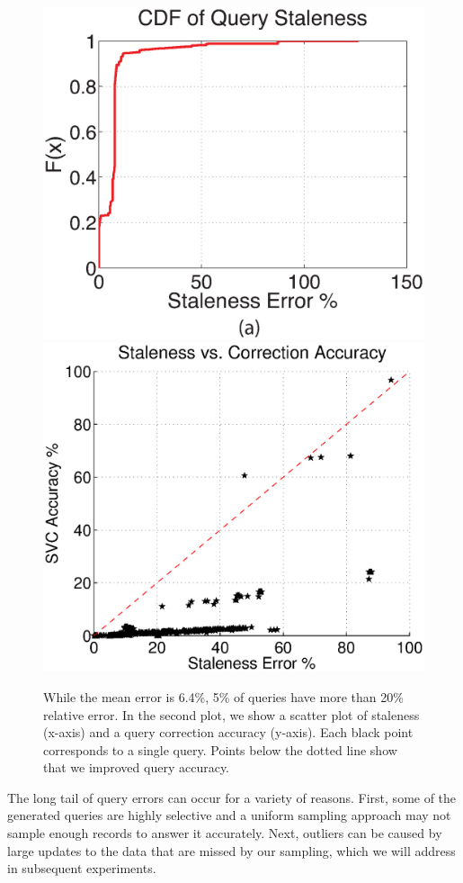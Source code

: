 \begin{figure}[ht!]
\centering
 \includegraphics[scale=0.22]{exp/query_error_dist.eps}
 \includegraphics[scale=0.21]{exp/query_error_dist2.eps}\vspace{-.5em}
 \caption{While the mean error is 6.4\%, 5\% of queries have more than 20\% relative error. In the second plot, we show a scatter plot of staleness (x-axis) and a query correction accuracy (y-axis). Each black point corresponds to a single query. Points below the dotted line show that we improved query accuracy.}\label{exp3dist} %
\end{figure}
The long tail of query errors can occur for a variety of reasons.
First, some of the generated queries are highly selective and a uniform sampling approach may not sample enough records to answer it accurately.
Next, outliers can be caused by large updates to the data that are missed by our sampling, which we will address in subsequent experiments.

